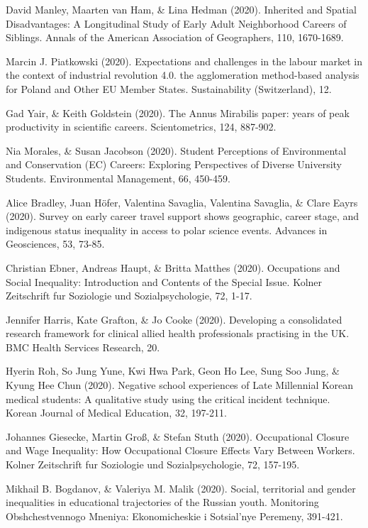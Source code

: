 \documentclass[runningheads]{llncs}
\begin{document}
\begin{multicols}{2}
David Manley, Maarten van Ham, \& Lina Hedman (2020). Inherited and Spatial Disadvantages: A Longitudinal Study of Early Adult Neighborhood Careers of Siblings. Annals of the American Association of Geographers, 110, 1670-1689.

Marcin J. Piatkowski (2020). Expectations and challenges in the labour market in the context of industrial revolution 4.0. the agglomeration method-based analysis for Poland and Other EU Member States. Sustainability (Switzerland), 12.

Gad Yair, \& Keith Goldstein (2020). The Annus Mirabilis paper: years of peak productivity in scientific careers. Scientometrics, 124, 887-902.

Nia Morales, \& Susan Jacobson (2020). Student Perceptions of Environmental and Conservation (EC) Careers: Exploring Perspectives of Diverse University Students. Environmental Management, 66, 450-459.

Alice Bradley, Juan Höfer, Valentina Savaglia, Valentina Savaglia, \& Clare Eayrs (2020). Survey on early career travel support shows geographic, career stage, and indigenous status inequality in access to polar science events. Advances in Geosciences, 53, 73-85.

Christian Ebner, Andreas Haupt, \& Britta Matthes (2020). Occupations and Social Inequality: Introduction and Contents of the Special Issue. Kolner Zeitschrift fur Soziologie und Sozialpsychologie, 72, 1-17.

Jennifer Harris, Kate Grafton, \& Jo Cooke (2020). Developing a consolidated research framework for clinical allied health professionals practising in the UK. BMC Health Services Research, 20.

Hyerin Roh, So Jung Yune, Kwi Hwa Park, Geon Ho Lee, Sung Soo Jung, \& Kyung Hee Chun (2020). Negative school experiences of Late Millennial Korean medical students: A qualitative study using the critical incident technique. Korean Journal of Medical Education, 32, 197-211.

Johannes Giesecke, Martin Groß, \& Stefan Stuth (2020). Occupational Closure and Wage Inequality: How Occupational Closure Effects Vary Between Workers. Kolner Zeitschrift fur Soziologie und Sozialpsychologie, 72, 157-195.

Mikhail B. Bogdanov, \& Valeriya M. Malik (2020). Social, territorial and gender inequalities in educational trajectories of the Russian youth. Monitoring Obshchestvennogo Mneniya: Ekonomicheskie i Sotsial'nye Peremeny, 391-421.


\end{multicols}
\end{document}
